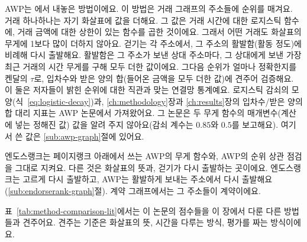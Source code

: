 AWP는 \textcite{do2023awp}에서 내놓은 방법이에요. 이 방법은 거래 그래프의 주소들에 순위를 매겨요. 거래 하나하나는 자기 화살표에 값을 더해요. 그 값은 거래 시간에 대한 로지스틱 함수에, 거래 금액에 대한 상한이 있는 함수를 곱한 것이에요. 그래서 어떤 거래도 화살표의 무게에 1보다 많이 더하지 않아요. 걷기는 각 주소에서, 그 주소의 활발함(활동 정도)에 비례해 다시 출발해요. 활발함은 그 주소가 보낸 상대 주소마다, 그 상대에게 보낸 가장 최근 거래의 시간 무게를 구해 모두 더한 값이에요. 그다음 순위가 얼마나 정확한지를 켄달의 $\tau$로, 입차수와 받은 양의 합(들어온 금액을 모두 더한 값)에 견주어 검증해요. 이 둘은 저자들이 밝힌 순위에 대한 직관과 맞는 연결망 통계예요. 로지스틱 감쇠의 모양(식~\eqref{eq:logistic-decay})과, \ref{ch:methodology}장과 \ref{ch:results}장의 입차수/받은 양의 합 대리 지표는 AWP 논문에서 가져왔어요. 그 논문은 두 무게 함수의 매개변수(계산에 넣는 정해진 값) 값을 알려 주지 않아요(감쇠 계수는 $0.85$와 $0.5$를 보고해요). 여기서 쓴 값은 \ref{sub:awp-graph}절에 있어요.

엔도스랭크는 페이지랭크 아래에서 쓰는 AWP의 무게 함수와, AWP의 순위 상관 점검을 그대로 지켜요. 다른 것은 화살표의 뜻과, 걷기가 다시 출발하는 곳이에요. 엔도스랭크는 고르게 다시 출발하고, AWP는 활발하게 보내는 주소에서 다시 출발해요(\ref{sub:endorserank-graph}절). 계약 그래프에서는 그 주소들이 계약이에요.


표~\ref{tab:method-comparison-lit}에서는 이 논문의 점수들을 이 장에서 다룬 다른 방법들과 견주어요. 견주는 기준은 화살표의 뜻, 시간을 다루는 방식, 평가를 짜는 방식이에요.

